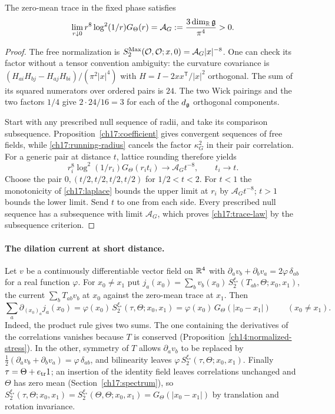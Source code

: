 \begin{theorem}
\label{ch17:all-radii}
The zero-mean trace in the fixed phase satisfies
\begin{equation}
 \lim_{r\downarrow0}r^8\log^2(1/r)G_\Theta(r)
              =\mathcal A_G:=\frac{3\dim_\mathbb R\mathfrak g}{\pi^4}>0.
 \label{ch17:trace-law}
\end{equation}
\end{theorem}
\begin{proof}
The free normalization is
$S_2^{\rm Max}(\mathcal O,\mathcal O;x,0)=\mathcal A_G|x|^{-8}$.
One can check its factor without a tensor convention ambiguity:
the curvature covariance is
$(H_{ai}H_{bj}-H_{aj}H_{bi})/(\pi^2|x|^4)$ with
$H=I-2xx^{\mathsf T}/|x|^2$ orthogonal. The sum of its squared
numerators over ordered pairs is $24$. The two Wick pairings and
the two factors $1/4$ give $2\cdot24/16=3$ for each of the $d_{\mathfrak g}$ orthogonal components.

Start with any prescribed null sequence of radii, and take its
comparison subsequence. Proposition~\ref{ch17:coefficient} gives
convergent sequences of free fields, while \eqref{ch17:running-radius} cancels
the factor $\kappa_G^2$ in their pair correlation. For a generic
pair at distance $t$, lattice rounding therefore yields
\[
 r_i^8\log^2(1/r_i)G_\Theta(r_it_i)\to\mathcal A_Gt^{-8},
                         \qquad t_i\to t.
\]
Choose the pair $0,(t/2,t/2,t/2,t/2)$ for $1/2<t<2$.
For $t<1$ the monotonicity of \eqref{ch17:laplace} bounds the upper
limit at $r_i$ by $\mathcal A_Gt^{-8}$; $t>1$ bounds the lower
limit. Send $t$ to one from each side. Every prescribed null
sequence has a subsequence with limit $\mathcal A_G$, which proves
\eqref{ch17:trace-law} by the subsequence criterion.
\end{proof}

\paragraph{The dilation current at short distance.}
Let $v$ be a continuously differentiable vector field on $\mathbb R^4$ with
$\partial_av_b+\partial_bv_a=2\varphi\,\delta_{ab}$ for a real function
$\varphi$. For $x_0\neq x_1$ put
$j_a(x_0)=\sum_bv_b(x_0)\,S_2^{\xi_*}(T_{ab},\Theta;x_0,x_1)$, the current
$\sum_bT_{ab}v_b$ at $x_0$ against the zero-mean trace at $x_1$. Then
\[
 \sum_a\partial_{(x_0)_a}j_a(x_0)=\varphi(x_0)\,S_2^{\xi_*}(\tau,\Theta;x_0,x_1)
       =\varphi(x_0)\,G_\Theta(|x_0-x_1|)\qquad(x_0\neq x_1).
\]
Indeed, the product rule gives two sums. The one containing the derivatives
of the correlations vanishes because $T$ is conserved
(Proposition~\ref{ch14:normalized-stress}). In the other, symmetry of $T$
allows $\partial_av_b$ to be replaced by
$\tfrac12(\partial_av_b+\partial_bv_a)=\varphi\,\delta_{ab}$, and
bilinearity leaves $\varphi\,S_2^{\xi_*}(\tau,\Theta;x_0,x_1)$. Finally
$\tau=\Theta+e_{\rm tr}1$; an insertion of the identity field leaves correlations unchanged
and $\Theta$ has zero mean (Section~\ref{ch17:spectrum}), so
$S_2^{\xi_*}(\tau,\Theta;x_0,x_1)=S_2^{\xi_*}(\Theta,\Theta;x_0,x_1)
=G_\Theta(|x_0-x_1|)$ by translation and rotation invariance.

